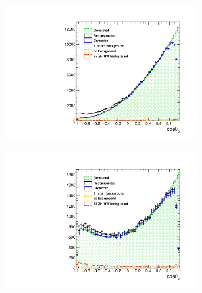 \begin{figure}
	\centering
	\begin{subfigure}{0.5\textwidth}
		\includegraphics[width=0.95\textwidth]{ILD/plots/basymmetry-final-left.pdf}
		\caption{\label{fig:BAsymmetryFinal_a_3F} }
	\end{subfigure}%
	\begin{subfigure}{0.5\textwidth}
		\centering
		\includegraphics[width=0.95\textwidth]{ILD/plots/basymmetry-final-right.pdf}

\end{subfigure}
\end{figure}
